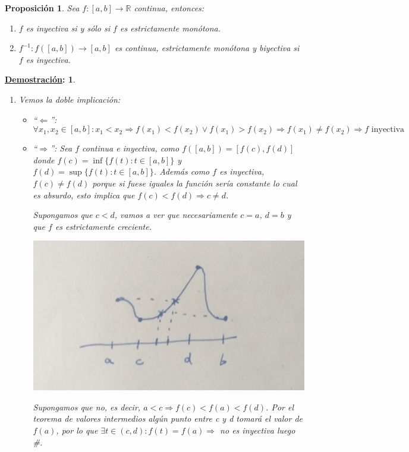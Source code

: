 \documentclass[10pt,a4paper,openright]{book}
\theoremstyle{break}
\newtheorem*{prop}{Proposición}
\newtheorem*{demo}{\underline{Demostración}:}
\begin{document}
\begin{prop}
Sea $f:[a,b]\rightarrow \mathbb R$ continua, entonces:
\begin{enumerate}
\item $f$ es inyectiva si y sólo si $f$ es estrictamente monótona.
\item $f^{-1}: f([a,b])\rightarrow [a,b]$ es continua, estrictamente monótona y biyectiva si $f$ es inyectiva.
\end{enumerate}
\end{prop}
\begin{demo}
\begin{enumerate}
\item Vemos la doble implicación:
	\begin{itemize}
	\item ``$\Leftarrow$'':
	$$\forall x_1, x_2\in [a,b]: x_1<x_2\Rightarrow f(x_1)<f(x_2) \vee f(x_1)>f(x_2)\Rightarrow f(x_1)\neq f(x_2) \Rightarrow f\mbox{ inyectiva}$$
	
	\item ``$\Rightarrow$'':
	Sea $f$ continua e inyectiva, como $f([a,b])=[f(c), f(d)]$ donde $f(c)=\inf\{f(t): t\in [a,b]\}$ y $f(d)=\sup\{f(t): t\in [a,b]\}$. Además como $f$ es inyectiva, $f(c)\neq f(d)$ porque si fuese iguales la función sería constante lo cual es absurdo, esto implica que $f(c)<f(d)\Rightarrow c\neq d$.
	
	Supongamos que $c<d$, vamos a ver que necesariamente $c=a$, $d=b$ y que $f$ es estrictamente creciente.
	\begin{center}
	\includegraphics[scale=0.20]{inyectivas continuas son monotonas}
	\end{center}
	Supongamos que no, es decir, $a<c\Rightarrow f(c)< f(a)< f(d)$. Por el teorema de valores intermedios algún punto entre c y d tomará el valor de $f(a)$, por lo que $\exists t\in (c,d): f(t)=f(a)\Rightarrow $ no es inyectiva luego \#.
	

\end{itemize}
\end{enumerate}
\end{demo}
\end{document}
